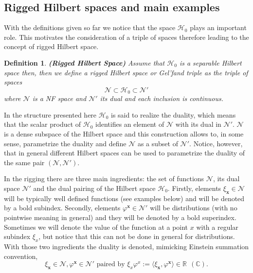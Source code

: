 \documentclass{elsarticle}%
\newtheorem{definition}{Definition}%
\begin{document}
\subsection{Rigged Hilbert spaces and main examples}

With the definitions given so far we notice that the space $\mathcal{H}_0$ plays an important role. This motivates the consideration of a triple of spaces therefore leading to the concept of rigged Hilbert space. 

\begin{definition} {\bf (Rigged Hilbert Space)}
    \label{def:RHS}
    Assume that $\mathcal{H}_0$ is a separable Hilbert space then, then we define a rigged Hilbert space or Gel'fand triple as the triple of spaces
\begin{equation*}
\label{eq:rigged}
\mathcal{N}\subset \mathcal{H}_0 \subset \mathcal{N}'
\end{equation*}
where $\mathcal{N}$ is a NF space and $\mathcal{N}'$ its dual and each inclusion is continuous. 

\end{definition}

In the structure  presented here $\mathcal{H}_0$ is said to realize the duality, which means that the scalar product of $\mathcal{H}_0$ identifies an element of $\mathcal{N}$ with its dual in $\mathcal{N}'$. 
$\mathcal{N}$ is a dense subspace of the Hilbert space and this construction allows to, in some sense, parametrize the duality and define 
  $\mathcal{N}$ as a subset of $\mathcal{N}'$. Notice, however, that in general different Hilbert spaces can be used to parametrize the duality of the same pair $(\mathcal{N},\mathcal{N}')$.


In the rigging there are three main ingredients: the set of functions $\mathcal{N}$, its dual space  $\mathcal{N}'$ and the dual pairing of the Hilbert space $\mathcal{H}_0$. Firstly,  elements  $\xi_{\mathbf{x}}\in\mathcal{N}$ will be typically well defined functions (see examples below) and will be  denoted by a bold subindex.  Secondly,  elements $\varphi^{\mathbf{x}}\in\mathcal{N}'$ will be distributions (with no pointwise meaning in general) and they will be  denoted by a bold superindex. Sometimes we will denote the value of the function at a point $x$  with  a regular subindex $\xi_x$, but notice that this  can not be done in general for distributions. With those two ingredients the duality is denoted, mimicking Einstein summation convention, 
\begin{equation}
\label{eq:dualityNotationDistributions}
\xi_{\mathbf{x}}\in\mathcal{N}, \varphi^{\mathbf{x}}\in\mathcal{N}' \textrm{ paired by } \xi_x\varphi^x :=\langle\xi_{\mathbf{x}}, \varphi^{\mathbf{x}}\rangle \in \mathbb{R}\ \ (\mathbb{C}).
\end{equation}
\end{document}
